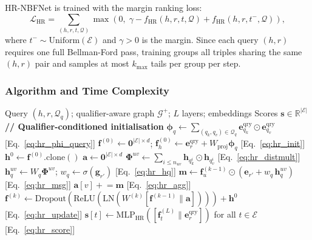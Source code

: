 \documentclass[10pt,journal,compsoc]{IEEEtran}
\begin{document}
HR-NBFNet is trained with the margin ranking loss:
\begin{equation}
  \mathcal{L}_{\mathrm{HR}}
  = \sum_{(h,r,t,\mathcal{Q})}
    \max\!\left(0,\;
      \gamma
      - f_{\mathrm{HR}}(h,r,t,\mathcal{Q})
      + f_{\mathrm{HR}}(h,r,t^-,\mathcal{Q})
    \right),
  \label{eq:margin_loss}
\end{equation}
where $t^- \sim \mathrm{Uniform}(\mathcal{E})$ and
$\gamma > 0$ is the margin.
Since each query $(h,r)$ requires one full Bellman-Ford
pass, training groups all triples sharing the same
$(h,r)$ pair and samples at most $k_{\max}$ tails per
group per step.

\subsubsection{Algorithm and Time Complexity}
\label{sssec:hr_complexity}

\begin{algorithm}[t]
\caption{HR-NBFNet: Inference for Query $(h,r,?,\mathcal{Q}_q)$}
\label{alg:hrnbfnet}
\begin{algorithmic}[1]
\Require Query $(h, r, \mathcal{Q}_q)$;
  qualifier-aware graph $\mathcal{G}^+$;
  $L$ layers; embeddings
\Ensure Scores $\mathbf{s} \in \mathbb{R}^{|\mathcal{E}|}$
\State \textbf{// Qualifier-conditioned initialisation}
\State $\boldsymbol{\phi}_q \leftarrow
  \sum_{(q_k,q_v)\in\mathcal{Q}_q}
  \mathbf{e}_{q_k}^{\mathrm{qry}} \odot \mathbf{e}_{q_v}^{\mathrm{qry}}$
  \hfill [Eq.~\ref{eq:hr_phi_query}]
\State $\mathbf{f}^{(0)} \leftarrow \mathbf{0}^{|\mathcal{E}|\times d}$;\;
  $\mathbf{f}_h^{(0)} \leftarrow
  \mathbf{e}_r^{\mathrm{qry}} + W_{\mathrm{proj}}\boldsymbol{\phi}_q$
  \hfill [Eq.~\ref{eq:hr_init}]
\State $\mathbf{h}^0 \leftarrow \mathbf{f}^{(0)}.\mathrm{clone}()$
  \State $\mathbf{a} \leftarrow \mathbf{0}^{|\mathcal{E}|\times d}$
    \State $\boldsymbol{\Phi}^{uv} \leftarrow
      \sum_{i \leq n_{uv}}
      \mathbf{h}_{q_k^i} \odot \mathbf{h}_{q_v^i}$
      \hfill [Eq.~\ref{eq:hr_distmult}]
    \State $\mathbf{h}_q^{uv} \leftarrow W_q \boldsymbol{\Phi}^{uv}$;\;
      $w_q \leftarrow \sigma(\mathbf{g}_{r'})$
      \hfill [Eq.~\ref{eq:hr_hq}]
    \State $\mathbf{m} \leftarrow
      \mathbf{f}_u^{(k-1)} \odot
      (\mathbf{e}_{r'} + w_q\,\mathbf{h}_q^{uv})$
      \hfill [Eq.~\ref{eq:hr_msg}]
    \State $\mathbf{a}[v] \mathrel{+}= \mathbf{m}$
      \hfill [Eq.~\ref{eq:hr_agg}]
  \EndFor
  \State $\mathbf{f}^{(k)} \leftarrow
    \mathrm{Dropout}(\mathrm{ReLU}(\mathrm{LN}(
    W^{(k)}[\mathbf{f}^{(k-1)} \| \mathbf{a}])))
    + \mathbf{h}^0$
    \hfill [Eq.~\ref{eq:hr_update}]
\EndFor
\State \Return
  $\mathbf{s}[t] \leftarrow
  \mathrm{MLP}_{\mathrm{HR}}([\mathbf{f}_t^{(L)} \|
  \mathbf{e}_r^{\mathrm{qry}}])$
  for all $t \in \mathcal{E}$
  \hfill [Eq.~\ref{eq:hr_score}]
\end{algorithmic}
\end{algorithm}
\end{document}
